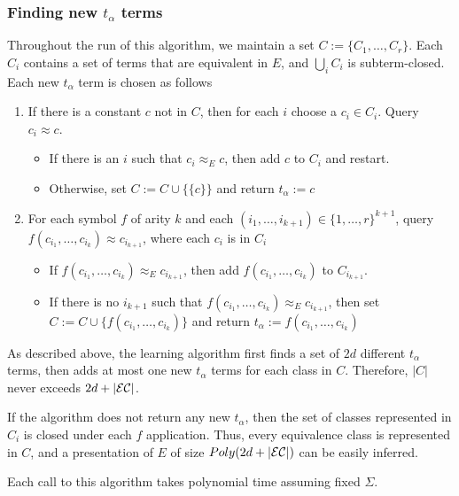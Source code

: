 \subsubsection{Finding new $t_\alpha$ terms}
Throughout the run of this algorithm, we maintain a set $C := \{ C_1, \dots, C_r\}$.
Each $C_i$ contains a set of terms that are equivalent in $E$, and $\bigcup_i C_i$ is subterm-closed.
Each new $t_\alpha$ term is chosen as follows
\begin{enumerate}
\item If there is a constant $c$ not in $C$, then for each $i$ choose a $c_i \in C_i$. Query $c_i \approx c$.
	\begin{itemize}
	\item If there is an $i$ such that $c_i \approx_E c$, then add $c$ to $C_i$ and restart.
	\item Otherwise, set $C := C \cup \{ \{c\} \}$ and return $t_\alpha := c$
	\end{itemize}
\item For each symbol $f$ of arity $k$ and each $(i_1,\dots,i_{k+1}) \in \{1,\dots,r\}^{k+1}$, query $f(c_{i_1}, \dots, c_{i_k}) \approx  c_{i_{k+1}}$, where each $c_i$ is in $C_i$
	\begin{itemize}
	\item	If $f(c_{i_1}, \dots, c_{i_k}) \approx_E  c_{i_{k+1}}$, then add $f(c_{i_1}, \dots, c_{i_k})$ to $C_{i_{k+1}}$.
	\item If there is no $i_{k+1}$ such that $f(c_{i_1}, \dots, c_{i_k}) \approx_E  c_{i_{k+1}}$, then set $C := C \cup \{f(c_{i_1}, \dots, c_{i_k})\}$ and return $t_\alpha := f(c_{i_1}, \dots, c_{i_k})$
	\end{itemize}
\end{enumerate}

As described above, the learning algorithm first finds a set of $2d$ different $t_\alpha$ terms,  then adds at most one new $t_\alpha$ terms for each class in $C$. 
Therefore,  $|C|$ never exceeds $2d+ |{\mathcal{E}\mathcal{C}}|$. 

If the algorithm does not return any new $t_\alpha$, then the set of classes represented in $C_i$ is closed under each $f$ application. 
Thus, every equivalence class is represented in $C$, and a presentation of $E$ of size $Poly(2d + |{\mathcal{E}\mathcal{C}}|)$ can be easily inferred.

Each call to this algorithm takes polynomial time assuming fixed $\Sigma$.

